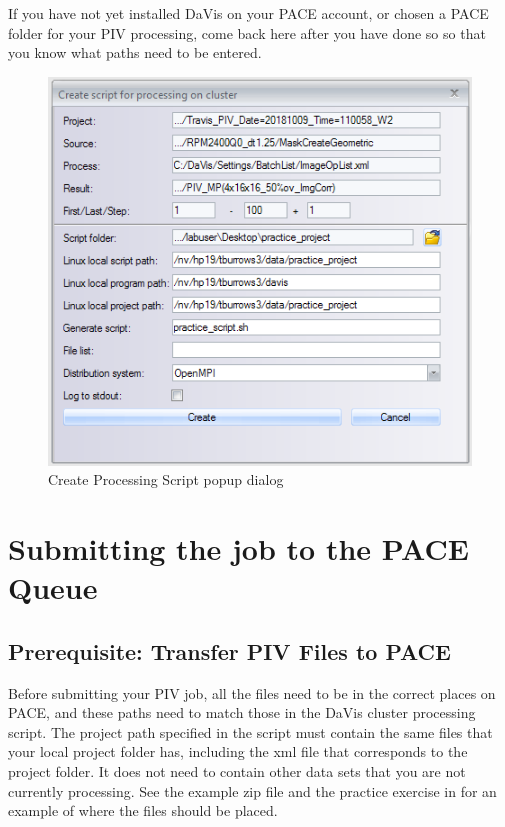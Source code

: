 \documentclass{article}
\begin{document}
\begin{enumerate}
			If you have not yet installed DaVis on your PACE account, or chosen a PACE folder for your PIV processing, come back here after you have done so so that you know what paths need to be entered.
			
			\begin{figure}[h!]
				\centering
				\includegraphics[width=5in]{./cluster_script_processing.png} 
				\caption{Create Processing Script popup dialog}
			\end{figure}
	\end{enumerate}

	\section{Submitting the job to the PACE Queue}
	\subsection{Prerequisite: Transfer PIV Files to PACE}
	Before submitting your PIV job, all the files need to be in the correct places on PACE, and these paths need to match those in the DaVis cluster processing script.  The project path specified in the script must contain the same files that your local project folder has, including the xml file that corresponds to the project folder.  It does not need to contain other data sets that you are not currently processing.  See the example zip file and the practice exercise in  for an example of where the files should be placed.
	
\end{document}
